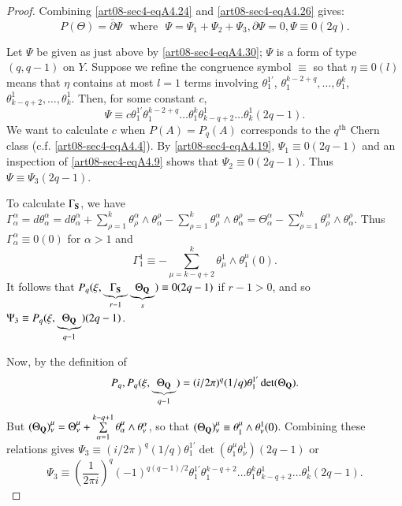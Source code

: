 \begin{proof}
Combining \eqref{art08-sec4-eqA4.24} and \eqref{art08-sec4-eqA4.26} gives:
\begin{equation*}
P(\Theta)=\overline{\partial}\Psi \text{~ where~ } \Psi=\Psi_{1}+\Psi_{2}+\Psi_{3},\partial \Psi=0,\Psi\equiv 0(2q).\tag{A4.30}\label{art08-sec4-eqA4.30}
\end{equation*}

Let $\Psi$ be given as just above by \eqref{art08-sec4-eqA4.30}; $\Psi$ is a form of type $(q,q-1)$ on $Y$. Suppose we refine the congruence symbol $\equiv$ so that $\eta\equiv 0(l)$ means that $\eta$ contains at most $l=1$ terms involving $\theta^{1'}_{1}$, $\theta^{k-2+q}_{1},\ldots,\theta^{k}_{1}$, $\theta^{1}_{k-q+2},\ldots,\theta^{1}_{k}$. Then, for some constant $c$,
\begin{equation*}
\Psi \equiv c\theta^{1'}_{1}\theta^{k-2+q}_{1}\ldots\theta^{k}_{1}\theta^{1}_{k-q+2}\ldots\theta^{1}_{k}(2q-1).\tag{A4.31}\label{art08-sec4-eqA4.31}
\end{equation*}
We want to calculate $c$ when $P(A)=P_{q}(A)$ corresponds to the $q^{\text{th}}$ Chern class (c.f. \eqref{art08-sec4-eqA4.4}). By \eqref{art08-sec4-eqA4.19}, $\Psi_{1}\equiv 0(2q-1)$ and an inspection of \eqref{art08-sec4-eqA4.9} shows that $\Psi_{2}\equiv 0(2q-1)$. Thus $\Psi\equiv \Psi_{3}(2q-1)$.

To calculate $\Gamma_{\mathbf{S}}$, we have $\Gamma^{\alpha}_{\alpha}=d\theta^{\alpha}_{\alpha}=d\theta^{\alpha}_{\alpha}+\sum\limits^{k}_{\rho=1}\theta^{\alpha}_{\rho}\wedge \theta^{\rho}_{\alpha}-\sum\limits^{k}_{\rho=1}\theta^{\alpha}_{\rho}\wedge \theta^{\rho}_{\alpha}=\Theta^{\alpha}_{\alpha}-\sum\limits^{k}_{\rho=1}\theta^{\alpha}_{\rho}\wedge \theta^{\rho}_{\alpha}$. Thus $\Gamma^{\alpha}_{\alpha}\equiv 0(0)$ for $\alpha>1$ and 
$$
\Gamma^{1}_{1}\equiv -\sum\limits^{k}_{\mu=k-q+2}\theta^{1}_{\mu}\wedge \theta^{\mu}_{1}(0).
$$\pageoriginale
It follows that $P_{q}(\xi,\underbrace{\Gamma_{\mathbf{S}}}_{r-1}\underbrace{\Theta_{\mathbf{Q}}}_{s})\equiv 0(2q-1)$ if $r-1>0$, and so $\Psi_{3}\equiv P_{q}(\xi, \underbrace{\Theta_{\mathbf{Q}}}_{q-1})(2q-1)$.

Now, by the definition of 
$$
P_{q}, P_{q}(\xi,\underbrace{\Theta_{\mathbf{Q}}}_{q-1})=(i/2\pi)^{q}(1/q)\theta^{1'}_{1}\det(\Theta_{\mathbf{Q}}).
$$ 
But $(\Theta_{\mathbf{Q}})^{\mu}_{\nu}=\Theta^{\mu}_{\nu}+\sum\limits^{k-q+1}_{\alpha=1}\theta^{\mu}_{\alpha}\wedge \theta^{\alpha}_{\nu}$, so that $(\Theta_{\mathbf{Q}})^{\mu}_{\nu}\equiv \theta^{\mu}_{1}\wedge\theta^{1}_{\nu}(0)$. Combining these relations gives $\Psi_{3}\equiv (i/2\pi)^{q}(1/q)\theta^{1'}_{1}\det (\theta^{\mu}_{1}\theta^{1}_{\nu})(2q-1)$ or 
\begin{equation*}
\Psi_{3}\equiv \left(\frac{1}{2\pi i}\right)^{q}(-1)^{q(q-1)/2}\theta^{1'}_{1}\theta^{k-q+2}_{1}\ldots\theta^{k}_{1}\theta^{1}_{k-q+2}\ldots\theta^{1}_{k}(2q-1).\tag{A4.32}\label{art08-sec4-eqA4.32}
\end{equation*}


\end{proof}
